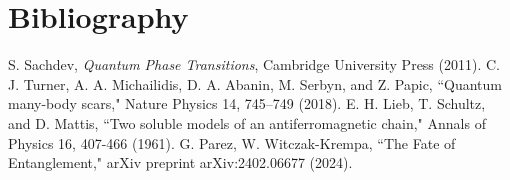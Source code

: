 \documentclass{article}
\begin{document}
\section*{Bibliography}
\begin{thebibliography}{9}
     S. Sachdev, \textit{Quantum Phase Transitions}, Cambridge University Press (2011).
     C. J. Turner, A. A. Michailidis, D. A. Abanin, M. Serbyn, and Z. Papic, ``Quantum many-body scars," Nature Physics 14, 745–749 (2018).
     E. H. Lieb, T. Schultz, and D. Mattis, ``Two soluble models of an antiferromagnetic chain," Annals of Physics 16, 407-466 (1961).
     G. Parez, W. Witczak-Krempa, ``The Fate of Entanglement," arXiv preprint arXiv:2402.06677 (2024).
\end{thebibliography}
\end{document}
